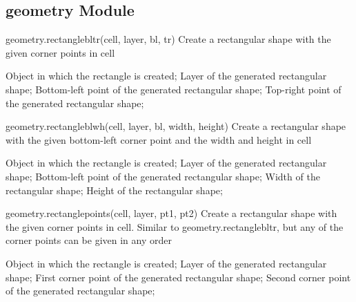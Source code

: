 \subsection{geometry Module}
\begin{APIfunc}{geometry.rectanglebltr(cell, layer, bl, tr)}
    Create a rectangular shape with the given corner points in cell
    \begin{APIparameters}
            Object in which the rectangle is created;
            Layer of the generated rectangular shape;
            Bottom-left point of the generated rectangular shape;
            Top-right point of the generated rectangular shape;
    \end{APIparameters}
\end{APIfunc}
\begin{APIfunc}{geometry.rectangleblwh(cell, layer, bl, width, height)}
    Create a rectangular shape with the given bottom-left corner point and the width and height in cell
    \begin{APIparameters}
            Object in which the rectangle is created;
            Layer of the generated rectangular shape;
            Bottom-left point of the generated rectangular shape;
            Width of the rectangular shape;
            Height of the rectangular shape;
    \end{APIparameters}
\end{APIfunc}
\begin{APIfunc}{geometry.rectanglepoints(cell, layer, pt1, pt2)}
    Create a rectangular shape with the given corner points in cell. Similar to geometry.rectanglebltr, but any of the corner points can be given in any order
    \begin{APIparameters}
            Object in which the rectangle is created;
            Layer of the generated rectangular shape;
            First corner point of the generated rectangular shape;
            Second corner point of the generated rectangular shape;
    \end{APIparameters}
\end{APIfunc}
